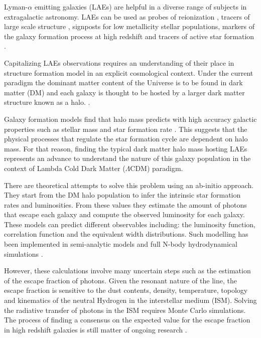 \documentclass{emulateapj}
\newcommand{\ly}{{\ifmmode{{\rm Ly}\alpha}\else{Ly$\alpha$~}\fi}}
\begin{document}
Lyman-$\alpha$ emitting galaxies (LAEs) are helpful in a diverse range
of subjects in extragalactic astronomy. LAEs can be
used as probes of reionization \citep{Dijkstra11}, tracers of large
scale structure \citep{Koehler2007},  signposts for low metallicity
stellar populations, markers of the galaxy formation process at high
redshift \citep{Dayal2009,ForeroRomero2012} and tracers of active star
formation \citep{Guaita2013}. 

Capitalizing LAEs observations requires an understanding of
their place in structure formation model in an explicit cosmological
context. Under the current paradigm the dominant matter content of the
Universe is to be found in dark matter (DM) and each galaxy is thought
to be hosted by a larger dark matter structure known as a
halo. \citep{Peebles1980,SpringelNature05}.  

Galaxy formation models find that halo mass predicts with high
accuracy galactic properties such as stellar mass and star formation
rate \citep{Behroozi2013a}. This suggests that the
physical processes that regulate the star formation cycle are 
dependent on halo mass.  For that reason, finding the typical dark
matter halo mass hosting LAEs represents an advance to understand the
nature of this galaxy population in the context of Lambda Cold Dark
Matter ($\Lambda$CDM) paradigm.  

There are theoretical attempts to solve this problem using an  ab-initio
approach. They start from the DM halo population to infer the
intrinsic star formation rates and \ly  luminosities. From these
values they estimate the amount of \ly photons that
escape each galaxy and compute the observed luminosity for each
galaxy. These models can predict different observables including: the
luminosity function, correlation function and the equivalent width
distributions. Such modelling has been implemented in semi-analytic
models \citep{Garel2012,Orsi2012} and  full N-body
hydrodynamical simulations \citep{Laursen2007, Dayal2009,
  ForeroRomero2011, Yajima2012}. 

However, these calculations involve many uncertain steps such as 
the estimation of the escape fraction of \ly photons. Given the resonant
nature of the \ly line, the escape fraction is sensitive to  the dust
contents, density, temperature, topology and kinematics of the neutral
Hydrogen in the interstellar medium (ISM). Solving the radiative
transfer of \ly photons in the ISM requires Monte Carlo
simulations. The process of finding a consensus on the expected value
for the \ly escape fraction in high redshift galaxies is still matter
of ongoing research
\citep{Neufeld1991,Verhamme2006,ForeroRomero2011,Dijkstra2012,Laursen2013,Orsi2012}.
\end{document}
